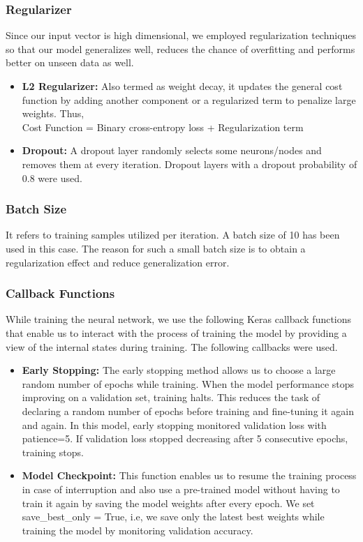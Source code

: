 \subsubsection{Regularizer}
Since our input vector is high dimensional, we employed regularization techniques so that our
model generalizes well, reduces the chance of overfitting and performs better on unseen data
as well.

\begin{itemize}
    \item \textbf{L2 Regularizer:} Also termed as weight decay, it updates the general cost function by adding another
component or a regularized term to penalize large weights. Thus,\\
Cost Function = Binary cross-entropy loss + Regularization term

\item \textbf{Dropout:} A dropout layer randomly selects some neurons/nodes and removes them at every
iteration. Dropout layers with a dropout probability of 0.8 were used.
\end{itemize}

\subsubsection{Batch Size}
It refers to training samples utilized per iteration. A batch size of 10 has been used in this
case. The reason for such a small batch size is to obtain a regularization effect and reduce
generalization error.

\subsubsection{Callback Functions}
While training the neural network, we use the following Keras callback functions that enable
us to interact with the process of training the model by providing a view of the internal states
during training. The following callbacks were used.

\begin{itemize}
\item \textbf{Early Stopping:} The early stopping method allows us to choose a large random number of epochs
while training. When the model performance stops improving on a validation set,
training halts. This reduces the task of declaring a random number of epochs
before training and fine-tuning it again and again. In this model, early stopping
monitored validation loss with patience=5. If validation loss stopped decreasing
after 5 consecutive epochs, training stops.

\item \textbf{Model Checkpoint:} This function enables us to resume the training process in case of interruption and
also use a pre-trained model without having to train it again by saving the model weights after every epoch. We set save\_best\_only = True, i.e, we save only the
latest best weights while training the model by monitoring validation accuracy.

\end{itemize}

